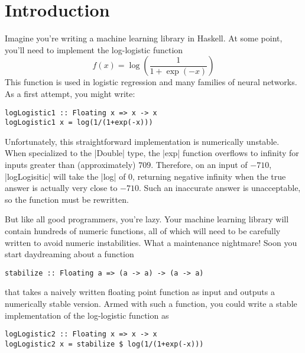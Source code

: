 \documentclass[preprint]{sigplanconf}
\theoremstyle{definition}
\begin{document}



\section{Introduction}


Imagine you're writing a machine learning library in Haskell.
At some point, you'll need to implement the log-logistic function
\begin{equation}
f(x) = \log\left(\frac{1}{1+\exp{(-x)}}\right)
\label{eq:log-logistic}
\end{equation}
This function is used in logistic regression and many families of neural networks.
As a first attempt, you might write:
\begin{lstlisting}
logLogistic1 :: Floating x => x -> x
logLogistic1 x = log(1/(1+exp(-x)))
\end{lstlisting}
Unfortunately, this straightforward implementation is numerically unstable.
When specialized to the |Double| type,
the |exp| function overflows to infinity for inputs greater than (approximately) $709$.
Therefore, on an input of $-710$,
|logLogisitic| will take the |log| of 0,
returning negative infinity when the true answer is actually very close to $-710$.
Such an inaccurate answer is unacceptable,
so the function must be rewritten.

But like all good programmers, you're lazy.
Your machine learning library will contain hundreds of numeric functions,
all of which will need to be carefully written to avoid numeric instabilities.
What a maintenance nightmare!
Soon you start daydreaming about a function
\begin{lstlisting}
stabilize :: Floating a => (a -> a) -> (a -> a)
\end{lstlisting}
that takes a naively written floating point function as input and outputs a numerically stable version.
Armed with such a function, you could write a stable implementation of the log-logistic function as
\begin{lstlisting}
logLogistic2 :: Floating x => x -> x
logLogistic2 x = stabilize $ log(1/(1+exp(-x)))
\end{lstlisting}
\end{document}

